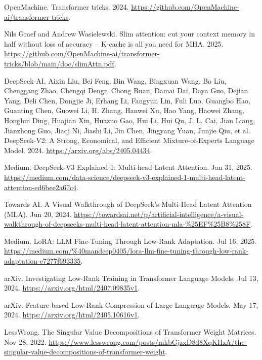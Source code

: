 \documentclass{article}
\begin{document}
\begin{thebibliography}{21}

OpenMachine. Transformer tricks. 2024. \url{https://github.com/OpenMachine-ai/transformer-tricks}.

Nils Graef and Andrew Wasielewski. Slim attention: cut your context memory in half without loss of accuracy – K-cache is all you need for MHA. 2025. \url{https://github.com/OpenMachine-ai/transformer-tricks/blob/main/doc/slimAttn.pdf}.

DeepSeek-AI, Aixin Liu, Bei Feng, Bin Wang, Bingxuan Wang, Bo Liu, Chenggang Zhao, Chengqi Dengr, Chong Ruan, Damai Dai, Daya Guo, Dejian Yang, Deli Chen, Dongjie Ji, Erhang Li, Fangyun Lin, Fuli Luo, Guangbo Hao, Guanting Chen, Guowei Li, H. Zhang, Hanwei Xu, Hao Yang, Haowei Zhang, Honghui Ding, Huajian Xin, Huazuo Gao, Hui Li, Hui Qu, J. L. Cai, Jian Liang, Jianzhong Guo, Jiaqi Ni, Jiashi Li, Jin Chen, Jingyang Yuan, Junjie Qiu, et al. DeepSeek-V2: A Strong, Economical, and Efficient Mixture-of-Experts Language Model. 2024. \url{https://arxiv.org/abs/2405.04434}.

Medium. DeepSeek-V3 Explained 1: Multi-head Latent Attention. Jan 31, 2025. \url{https://medium.com/data-science/deepseek-v3-explained-1-multi-head-latent-attention-ed6bee2a67c4}.

Towards AI. A Visual Walkthrough of DeepSeek's Multi-Head Latent Attention (MLA). Jun 20, 2024. \url{https://towardsai.net/p/artificial-intelligence/a-visual-walkthrough-of-deepseeks-multi-head-latent-attention-mla-%25EF%25B8%258F}.

Medium. LoRA: LLM Fine-Tuning Through Low-Rank Adaptation. Jul 16, 2025. \url{https://medium.com/%40mandeep0405/lora-llm-fine-tuning-through-low-rank-adaptation-e7277f693335}.

arXiv. Investigating Low-Rank Training in Transformer Language Models. Jul 13, 2024. \url{https://arxiv.org/html/2407.09835v1}.

arXiv. Feature-based Low-Rank Compression of Large Language Models. May 17, 2024. \url{https://arxiv.org/html/2405.10616v1}.

LessWrong. The Singular Value Decompositions of Transformer Weight Matrices. Nov 28, 2022. \url{https://www.lesswrong.com/posts/mkbGjzxD8d8XqKHzA/the-singular-value-decompositions-of-transformer-weight}.


\end{thebibliography}
\end{document}

